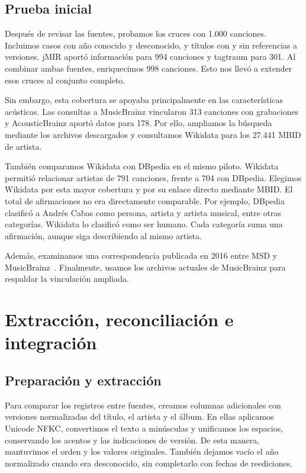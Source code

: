 \documentclass[11pt,a4paper]{article}
\begin{document}
\subsection{Prueba inicial}
Después de revisar las fuentes, probamos los cruces con 1.000 canciones. Incluimos casos con año conocido y desconocido, y títulos con y sin referencias a versiones. jMIR aportó información para 994 canciones y tagtraum para 301. Al combinar ambas fuentes, enriquecimos 998 canciones. Esto nos llevó a extender esos cruces al conjunto completo.

Sin embargo, esta cobertura se apoyaba principalmente en las características acústicas. Las consultas a MusicBrainz vincularon 313 canciones con grabaciones y AcousticBrainz aportó datos para 178. Por ello, ampliamos la búsqueda mediante los archivos descargados y consultamos Wikidata para los 27.441 MBID de artista.

También comparamos Wikidata con DBpedia en el mismo piloto. Wikidata permitió relacionar artistas de 791 canciones, frente a 704 con DBpedia. Elegimos Wikidata por esta mayor cobertura y por su enlace directo mediante MBID. El total de afirmaciones no era directamente comparable. Por ejemplo, DBpedia clasificó a Andrés Cabas como persona, artista y artista musical, entre otras categorías. Wikidata lo clasificó como ser humano. Cada categoría suma una afirmación, aunque siga describiendo al mismo artista.

Además, examinamos una correspondencia publicada en 2016 entre MSD y MusicBrainz~\cite{mapeo}. Finalmente, usamos los archivos actuales de MusicBrainz para respaldar la vinculación ampliada.

\section{Extracción, reconciliación e integración}
\subsection{Preparación y extracción}
Para comparar los registros entre fuentes, creamos columnas adicionales con versiones normalizadas del título, el artista y el álbum. En ellas aplicamos Unicode NFKC, convertimos el texto a minúsculas y unificamos los espacios, conservando los acentos y las indicaciones de versión. De esta manera, mantuvimos el orden y los valores originales. También dejamos vacío el año normalizado cuando era desconocido, sin completarlo con fechas de reediciones.
\end{document}
